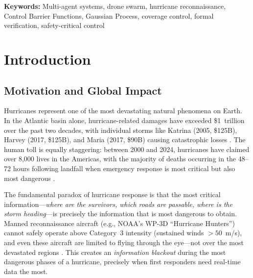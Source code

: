 \documentclass[12pt,a4paper,twocolumn]{article}
\begin{document}
\textbf{Keywords:} Multi-agent systems, drone swarm, hurricane reconnaissance, Control Barrier Functions, Gaussian Process, coverage control, formal verification, safety-critical control

\section{Introduction}
\label{sec:introduction}

\subsection{Motivation and Global Impact}
\label{sec:motivation}

Hurricanes represent one of the most devastating natural phenomena on Earth. In the Atlantic basin alone, hurricane-related damages have exceeded \$1~trillion over the past two decades, with individual storms like Katrina (2005, \$125B), Harvey (2017, \$125B), and Maria (2017, \$90B) causing catastrophic losses \citep{NOAA2023}. The human toll is equally staggering: between 2000 and 2024, hurricanes have claimed over 8,000 lives in the Americas, with the majority of deaths occurring in the 48--72 hours following landfall when emergency response is most critical but also most dangerous \citep{NOAAHurricane2020}.

The fundamental paradox of hurricane response is that the most critical information---\emph{where are the survivors, which roads are passable, where is the storm heading}---is precisely the information that is most dangerous to obtain. Manned reconnaissance aircraft (e.g., NOAA's WP-3D ``Hurricane Hunters'') cannot safely operate above Category~3 intensity (sustained winds $>50$~m/s), and even these aircraft are limited to flying through the eye---not over the most devastated regions \citep{Prudden2018}. This creates an \textit{information blackout} during the most dangerous phases of a hurricane, precisely when first responders need real-time data the most.
\end{document}
